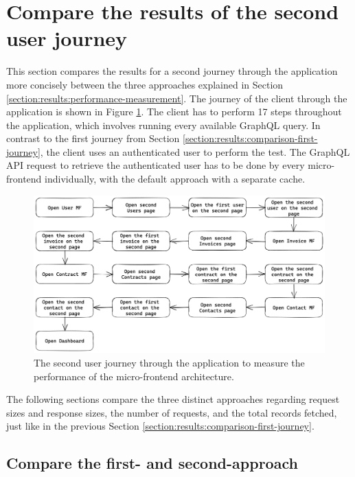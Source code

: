 \section{Compare the results of the second user journey}\label{section:results:comparison-second-journey}

This section compares the results for a second journey through the application more concisely between the three approaches explained in Section \ref{section:results:performance-measurement}. The journey of the client through the application is shown in Figure \ref{fig:results:evaluation-second-path}. The client has to perform 17 steps throughout the application, which involves running every available GraphQL query. In contrast to the first journey from Section \ref{section:results:comparison-first-journey}, the client uses an authenticated user to perform the test. The GraphQL \ac{API} request to retrieve the authenticated user has to be done by every micro-frontend individually, with the default approach with a separate cache.

\ifshowImages
\begin{figure}[H]
\centering
\includegraphics[width=1\linewidth]{images/results/evaluation-second-path.png}
\caption{The second user journey through the application to measure the performance of the micro-frontend architecture.}\label{fig:results:evaluation-second-path}
\end{figure}
\fi

\noindent The following sections compare the three distinct approaches regarding request sizes and response sizes, the number of requests, and the total records fetched, just like in the previous Section \ref{section:results:comparison-first-journey}.

\subsection{Compare the first- and second-approach}\label{subsection:results:comparison-second-path-first-second-approach}

